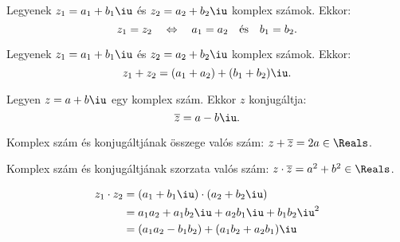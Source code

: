 \begin{definition}
  Legyenek $z_1 = a_1 + b_1\iu$ és $z_2 = a_2 + b_2\iu$ komplex számok. Ekkor:
  \[
    z_1 = z_2
    \quad \Leftrightarrow \quad
    a_1 = a_2 \quad \text{és} \quad b_1 = b_2
    \text.
  \]
\end{definition}

\begin{definition}
  Legyenek $z_1 = a_1 + b_1\iu$ és $z_2 = a_2 + b_2\iu$ komplex számok. Ekkor:
  \[
    z_1 + z_2 = (a_1 + a_2) + (b_1 + b_2)\iu
    \text.
  \]
\end{definition}

\begin{definition}[Konjugált]
  Legyen $z = a + b\iu$ egy komplex szám. Ekkor $z$ konjugáltja:
  \[
    \overline{z} = a - b\iu
    \text.
  \]
\end{definition}

\begin{note}
  Komplex szám és konjugáltjának összege valós szám:
  $z + \overline{z} = 2 a \in \Reals$.

  Komplex szám és konjugáltjának szorzata valós szám:
  $z \cdot \overline{z} = a^2 + b^2 \in \Reals$.
\end{note}

\begin{definition}
  \vspace{-1.5em}
  \begin{align*}
    z_1 \cdot z_2
     & = (a_1 + b_1\iu) \cdot (a_2 + b_2\iu)              \\
     & = a_1 a_2 + a_1 b_2\iu + a_2 b_1\iu + b_1 b_2\iu^2 \\
     & = (a_1 a_2 - b_1 b_2) + (a_1 b_2 + a_2 b_1)\iu
  \end{align*}
\end{definition}

